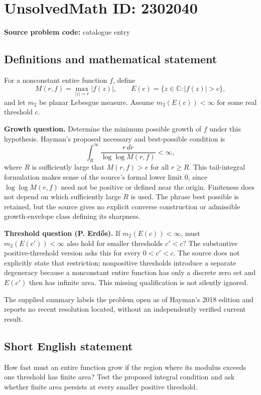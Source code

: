 \documentclass[11pt]{article}
\begin{document}
\section*{UnsolvedMath ID: 2302040}
\textbf{Source problem code:} catalogue entry
\subsection{Definitions and mathematical statement}
For a nonconstant entire function $f$, define
\[
M(r,f)=\max_{|z|=r}|f(z)|,\qquad
E(c)=\{z\in\mathbb C:|f(z)|>c\},
\]
and let $m_2$ be planar Lebesgue measure. Assume $m_2(E(c))<\infty$ for some real threshold $c$.

\textbf{Growth question.} Determine the minimum possible growth of $f$ under this hypothesis. Hayman's proposed necessary and best-possible condition is
\[
\int_R^{\infty}\frac{r\,dr}{\log\log M(r,f)}<\infty,
\]
where $R$ is sufficiently large that $M(r,f)>e$ for all $r\geq R$. This tail-integral formulation makes sense of the source's formal lower limit $0$, since $\log\log M(r,f)$ need not be positive or defined near the origin. Finiteness does not depend on which sufficiently large $R$ is used. The phrase best possible is retained, but the source gives no explicit converse construction or admissible growth-envelope class defining its sharpness.

\textbf{Threshold question (P. Erd\H{o}s).} If $m_2(E(c))<\infty$, must $m_2(E(c'))<\infty$ also hold for smaller thresholds $c'<c$? The substantive positive-threshold version asks this for every $0<c'<c$. The source does not explicitly state that restriction; nonpositive thresholds introduce a separate degeneracy because a nonconstant entire function has only a discrete zero set and $E(c')$ then has infinite area. This missing qualification is not silently ignored.

The supplied summary labels the problem open as of Hayman's 2018 edition and reports no recent resolution located, without an independently verified current result.
\subsection{Short English statement}
How fast must an entire function grow if the region where its modulus exceeds one threshold has finite area? Test the proposed integral condition and ask whether finite area persists at every smaller positive threshold.
\end{document}
